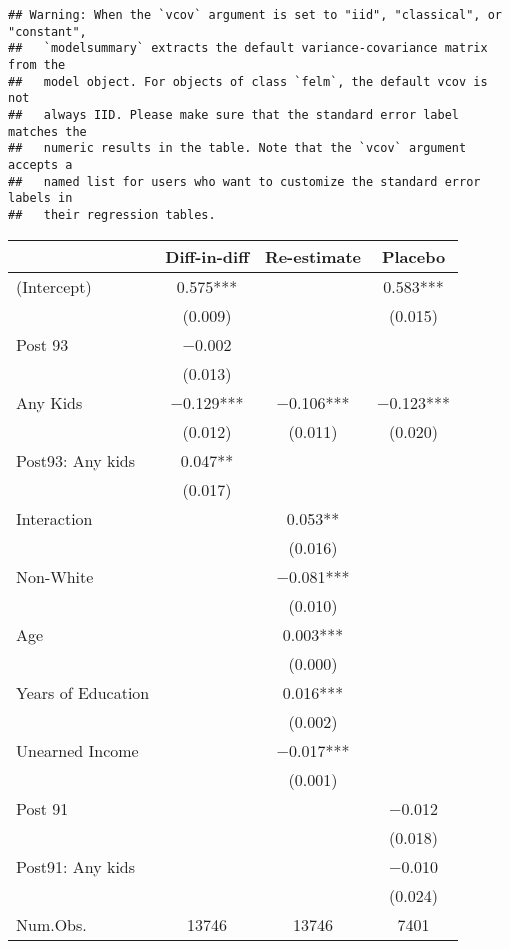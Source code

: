 \documentclass[
]{article}
\begin{document}
\begin{verbatim}
## Warning: When the `vcov` argument is set to "iid", "classical", or "constant",
##   `modelsummary` extracts the default variance-covariance matrix from the
##   model object. For objects of class `felm`, the default vcov is not
##   always IID. Please make sure that the standard error label matches the
##   numeric results in the table. Note that the `vcov` argument accepts a
##   named list for users who want to customize the standard error labels in
##   their regression tables.
\end{verbatim}

\begin{table}
\centering
\begin{tabular}[t]{lccc}
\toprule
  & Diff-in-diff & Re-estimate & Placebo\\
\midrule
(Intercept) & \num{0.575}*** &  & \num{0.583}***\\
 & (\num{0.009}) &  & (\num{0.015})\\
Post 93 & \num{-0.002} &  & \\
 & (\num{0.013}) &  & \\
Any Kids & \num{-0.129}*** & \num{-0.106}*** & \num{-0.123}***\\
 & (\num{0.012}) & (\num{0.011}) & (\num{0.020})\\
Post93: Any kids & \num{0.047}** &  & \\
 & (\num{0.017}) &  & \\
Interaction &  & \num{0.053}** & \\
 &  & (\num{0.016}) & \\
Non-White &  & \num{-0.081}*** & \\
 &  & (\num{0.010}) & \\
Age &  & \num{0.003}*** & \\
 &  & (\num{0.000}) & \\
Years of Education &  & \num{0.016}*** & \\
 &  & (\num{0.002}) & \\
Unearned Income &  & \num{-0.017}*** & \\
 &  & (\num{0.001}) & \\
Post 91 &  &  & \num{-0.012}\\
 &  &  & (\num{0.018})\\
Post91: Any kids &  &  & \num{-0.010}\\
 &  &  & (\num{0.024})\\
\midrule
Num.Obs. & \num{13746} & \num{13746} & \num{7401}\\

\end{tabular}
\end{table}
\end{document}
